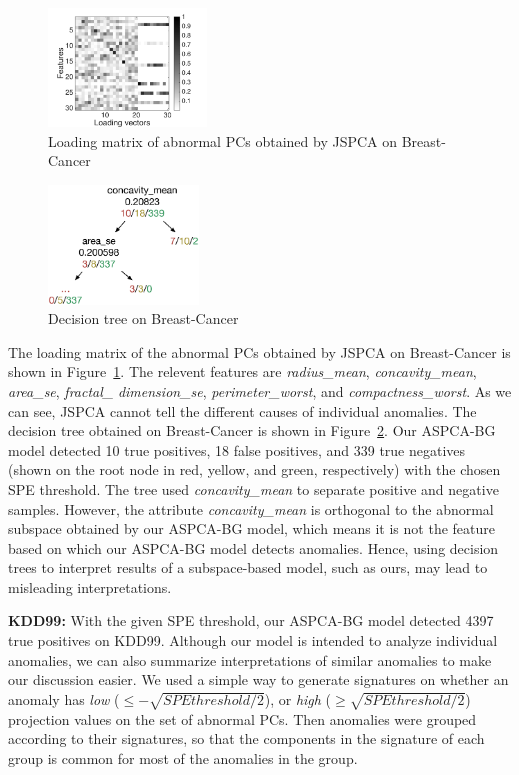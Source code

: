 \begin{figure}
\centering
	\includegraphics[width=42mm]{figure/Cancer-JSPCA-Components}
\caption{Loading matrix of abnormal PCs obtained by JSPCA on Breast-Cancer}
\label{fig:JSPCA:cancer}
\end{figure}

\begin{figure}
\centering
	\includegraphics[width=40mm]{figure/new/Cancer-DT}
	\caption{Decision tree on Breast-Cancer}
         \label{fig:tree:cancer}
\end{figure}

The loading matrix of the abnormal PCs obtained by JSPCA on Breast-Cancer is shown in Figure~\ref{fig:JSPCA:cancer}. The relevent features are \emph{radius\_mean}, \emph{concavity\_mean}, \emph{area\_se}, \emph{fractal\_} \emph{dimension\_se}, \emph{perimeter\_worst}, and \emph{compactness\_worst}. As we can see, JSPCA cannot tell the different causes of individual anomalies.
The decision tree obtained on Breast-Cancer is shown in Figure~\ref{fig:tree:cancer}. Our ASPCA-BG model detected 10 true positives, 18 false positives, and 339 true negatives (shown on the root node in red, yellow, and green, respectively) with the chosen SPE threshold. The tree used \emph{concavity\_mean} to separate positive and negative samples. However, the attribute \emph{concavity\_mean} is orthogonal to the abnormal subspace obtained by our ASPCA-BG model, which means it is not the feature based on which our ASPCA-BG model detects anomalies. Hence, using decision trees to interpret results of a subspace-based model, such as ours, may lead to misleading interpretations.

{\bf KDD99:}
With the given SPE threshold, our ASPCA-BG model detected 4397 true positives on KDD99. Although our model is intended to analyze individual anomalies, we can also summarize interpretations of similar anomalies to make our discussion easier. We used a simple way to generate signatures on whether an anomaly has \emph{low} ($\leq -\sqrt{SPE threshold/2}$), or \emph{high} ($\geq \sqrt{SPE threshold/2}$) projection values on the set of abnormal PCs. Then anomalies were grouped according to their signatures, so that the components in the signature of each group is common for most of the anomalies in the group.

